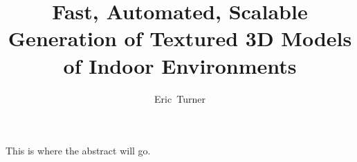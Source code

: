 \documentclass[10pt,onecolumn,oneside]{book}
\begin{document}

\title{Fast, Automated, Scalable Generation of Textured 3D Models of Indoor Environments}

%

\author{Eric~Turner}

\maketitle


\newpage
{}
\setcounter{page}{1}


This is where the abstract will go.


\newpage
{}
\setcounter{page}{1}

\end{document}
